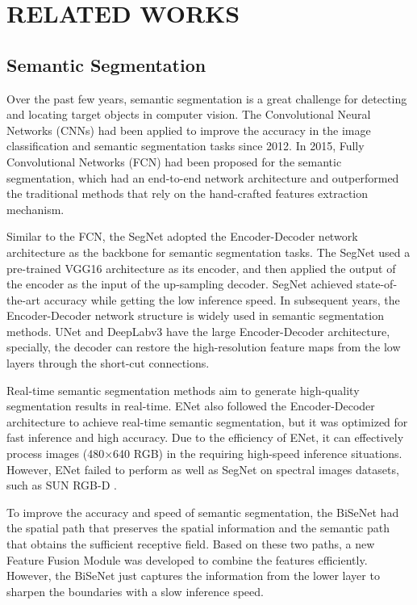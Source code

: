 \documentclass[letterpaper, 10 pt, conference]{ieeeconf}  \usepackage{graphicx}
\begin{document}
\section{RELATED WORKS}

\subsection{Semantic Segmentation}

Over the past few years, semantic segmentation is a great challenge for detecting and locating target objects in computer vision. The Convolutional Neural Networks (CNNs) \cite{krizhevsky2012imagenet} had been applied to improve the accuracy in the image classification and semantic segmentation tasks since 2012. In 2015, Fully Convolutional Networks (FCN) \cite{long2015fully} had been proposed for the semantic segmentation, which had an end-to-end network architecture and outperformed the traditional methods that rely on the hand-crafted features extraction mechanism. 

Similar to the FCN, the SegNet \cite{badrinarayanan2017segnet} adopted the Encoder-Decoder network architecture as the backbone for semantic segmentation tasks. The SegNet used a pre-trained VGG16 architecture as its encoder, and then applied the output of the encoder as the input of the up-sampling decoder. SegNet achieved state-of-the-art accuracy while getting the low inference speed. In subsequent years, the Encoder-Decoder network structure is widely used in semantic segmentation methods. UNet \cite{ronneberger2015u} and DeepLabv3 \cite{chen2018encoder} have the large Encoder-Decoder architecture, specially, the decoder can restore the high-resolution feature maps from the low layers through the short-cut connections.

Real-time semantic segmentation methods aim to generate high-quality segmentation results in real-time. ENet \cite{paszke2016enet} also followed the Encoder-Decoder architecture to achieve real-time semantic segmentation, but it was optimized for fast inference and high accuracy. Due to the efficiency of ENet, it can effectively process images (480×640 RGB) in the requiring high-speed inference situations. However, ENet failed to perform as well as SegNet on spectral images datasets, such as SUN RGB-D \cite{song2015sun}.

To improve the accuracy and speed of semantic segmentation, the BiSeNet \cite{yu2018bisenet} had the spatial path that preserves the spatial information and the semantic path that obtains the sufficient receptive field. Based on these two paths, a new Feature Fusion Module was developed to combine the features efficiently. However, the BiSeNet just captures the information from the lower layer to sharpen the boundaries with a slow inference speed.
\end{document}
